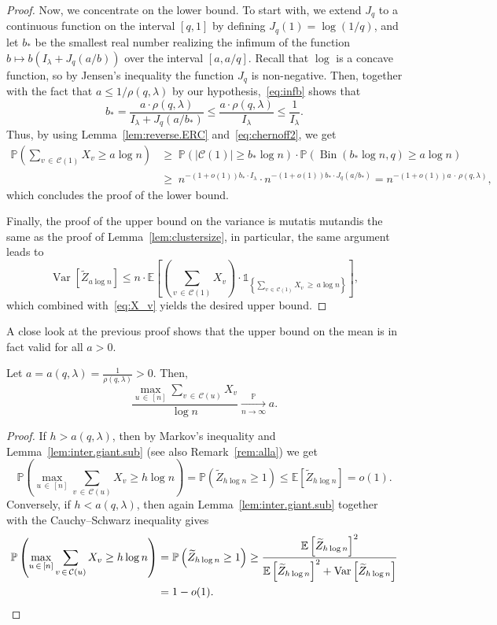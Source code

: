 \documentclass[AHL,Unicode,longabstracts,published]{cedram}
\renewcommand{\Pr}{\mathbb{P}}
\newcommand{\bbE}{\mathbb{E}}
\newcommand{\cC}{\mathcal{C}}
\DeclareMathOperator{\rVar}{Var}
\DeclareMathOperator{\rBin}{Bin}
\begin{document}
\begin{proof}
Now, we concentrate on the lower bound. To start with, we extend $J_q$ to a conti\-nuous function on the interval $[q,1]$ by defining $J_q(1)= \log(1/q)$, and let $b_*$ be the smallest real number realizing the infimum of the function $b\mapsto b(I_\lambda + J_q(a/b))$ over the interval $[a,a/q]$. Recall that $\log$ is a concave function, so by Jensen's inequality the function $J_q$ is non-negative. Then, together with the fact that $a\le 1/\rho(q,\lambda)$ by our hypothesis,~\eqref{eq:infb} shows that
\[
b_* = \frac{a \cdot \rho(q,\lambda)}{I_{\lambda} + J_q(a/b_*)} \le \frac{a \cdot \rho(q,\lambda)}{I_\lambda} \le \frac{1}{I_\lambda}.
\]
Thus, by using Lemma~\ref{lem:reverse.ERC} and~\eqref{eq:chernoff2}, we get
\begin{align*}
\Pr\left(\sum_{v\,\in\,\cC(1)} X_v\ge a\log n\right) &\ge\;
\Pr(|\cC(1)|\ge b_*\log n) \cdot \Pr(\rBin(b_*\log n,q)\ge a\log n)\\
& \ge \; n^{-(1+o(1))b_*\cdot I_{\lambda}}\cdot n^{-(1+o(1)) b_*\cdot J_q(a/b_*)}= n^{-(1+o(1)) a\,\cdot\, \rho(q,\lambda)},
\end{align*}
which concludes the proof of the lower bound.


Finally, the proof of the upper bound on the variance is mutatis mutandis the same as the proof of Lemma~\ref{lem:clustersize}, in particular, the same argument leads to
\[
\rVar\left[\widetilde Z_{a\log n}\right]\le n\cdot \bbE\left[\left(\sum_{v\,\in\,\cC(1)} X_v\right)\cdot \mathds{1}_{\left\{\sum_{v\,\in\,\cC(1)} X_v \,\ge\, a \log n\right\}} \right],
\]
which combined with~\eqref{eq:X_v} yields the desired upper bound.
\end{proof}

\begin{rema}\label{rem:alla}
A close look at the previous proof shows that the upper bound on the mean is in fact valid for all $a>0$.
\end{rema}

\begin{coro}\label{cor:LLN.inter.giant}
Let $a=a(q,\lambda)= \frac{1}{\rho(q,\lambda)}>0$. Then,
\[
\frac{\max_{u\,\in\,[n]} \sum_{v\,\in\,\cC(u)} X_v}{\log n} \xrightarrow[n\to\infty]{\Pr} a.
\]
\end{coro}
\begin{proof}
If $h>a(q,\lambda)$, then by Markov's inequality and Lemma~\ref{lem:inter.giant.sub} (see also Remark~\ref{rem:alla}) we get
\[
\Pr\left(\max_{u\,\in\,[n]} \sum_{v\,\in\,\cC(u)} X_v \ge h \log n \right) = \Pr\left(\widetilde Z_{h\log n}\ge 1\right) \le\bbE\left[\widetilde Z_{h\log n}\right] = o(1).
\]
Conversely, if $h<a(q,\lambda)$, then again Lemma~\ref{lem:inter.giant.sub} together with the Cauchy--Schwarz inequality gives
\begin{align*}
\Pr\left(\max_{u\,\in\,[n]} \sum_{v\,\in\,\cC(u)} X_v \ge h \log n \right) &= \Pr\left(\widetilde Z_{h\log n}\ge 1\right) \ge
\frac{\bbE\left[\widetilde Z_{h\log n}\right]^2}{\bbE\left[\widetilde Z_{h\log n}\right]^2+\rVar\left[\widetilde Z_{h\log n}\right]}\\
 &= 1-o(1).\qedhere
\end{align*}
\end{proof}
\end{document}
